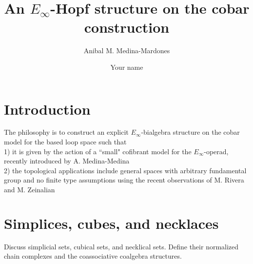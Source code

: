 \documentclass{amsart}
\begin{document}
\title{An $E_\infty$-Hopf structure on the cobar construction}
\author{Anibal M. Medina-Mardones}
\address{Max Plank Institute for Mathematics, Bonn, Germany}
\address{Department of Mathematics, University of Notre Dame, Notre Dame, IN, USA}
\author{Your name}
\address{Your address}


\begin{abstract}
	
\end{abstract} 

\vspace*{-1cm}

\maketitle

\tableofcontents

\section{Introduction}
The philosophy is to construct an explicit $E_{\infty}$-bialgebra structure on the cobar model for the based loop space such that
\\
1) it is given by the action of a ``small" cofibrant model for the $E_{\infty}$-operad, recently introduced by A. Medina-Medina
\\
2) the topological applications include general spaces with arbitrary fundamental group and no finite type assumptions using the recent observations of M. Rivera and M. Zeinalian 

\section{Simplices, cubes, and necklaces}

Discuss simplicial sets, cubical sets, and necklical sets. Define their normalized chain complexes and the coassociative coalgebra structures.
\end{document}
